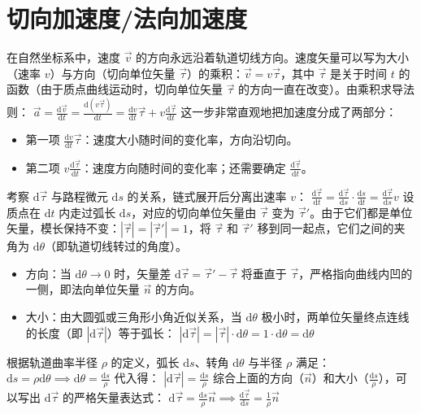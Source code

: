 \section{切向加速度/法向加速度}

在自然坐标系中，速度 $\vec{v}$ 的方向永远沿着轨道切线方向。速度矢量可以写为大小（速率 $v$）与方向（切向单位矢量 $\vec{\tau}$）的乘积：$\vec{v} = v\vec{\tau}$，其中 $\vec{\tau}$ 是关于时间 $t$ 的函数（由于质点曲线运动时，切向单位矢量 $\vec{\tau}$ 的方向一直在改变）。由乘积求导法则： \(\vec{a} = \frac{\mathrm{d}\vec{v}}{\mathrm{d}t} = \frac{\mathrm{d}(v\vec{\tau})}{\mathrm{d}t} = \frac{\mathrm{d}v}{\mathrm{d}t}\vec{\tau} + v\frac{\mathrm{d}\vec{\tau}}{\mathrm{d}t}\) 
这一步非常直观地把加速度分成了两部分：
\begin{itemize}
\item 第一项 $\frac{\mathrm{d}v}{\mathrm{d}t}\vec{\tau}$：速度大小随时间的变化率，方向沿切向。
\item 第二项 $v\frac{\mathrm{d}\vec{\tau}}{\mathrm{d}t}$：速度方向随时间的变化率；还需要确定 $\frac{\mathrm{d}\vec{\tau}}{\mathrm{d}t}$。
\end{itemize}
考察 $\mathrm{d}\vec{\tau}$ 与路程微元 $\mathrm{d}s$ 的关系，链式展开后分离出速率 $v$：
 \(\frac{\mathrm{d}\vec{\tau}}{\mathrm{d}t} = \frac{\mathrm{d}\vec{\tau}}{\mathrm{d}s} \cdot \frac{\mathrm{d}s}{\mathrm{d}t} = \frac{\mathrm{d}\vec{\tau}}{\mathrm{d}s} v\) 
设质点在 $\mathrm{d}t$ 内走过弧长 $\mathrm{d}s$，对应的切向单位矢量由 $\vec{\tau}$ 变为 $\vec{\tau}'$。由于它们都是单位矢量，模长保持不变：$|\vec{\tau}| = |\vec{\tau}'| = 1$，将 $\vec{\tau}$ 和 $\vec{\tau}'$ 移到同一起点，它们之间的夹角为 $\mathrm{d}\theta$（即轨道切线转过的角度）。
\begin{itemize}
\item 方向：当 $\mathrm{d}\theta \to 0$ 时，矢量差 $\mathrm{d}\vec{\tau} = \vec{\tau}' - \vec{\tau}$ 将垂直于 $\vec{\tau}$，严格指向曲线内凹的一侧，即法向单位矢量 $\vec{n}$ 的方向。
\item 大小：由大圆弧或三角形小角近似关系，当 $\mathrm{d}\theta$ 极小时，两单位矢量终点连线的长度（即 $|\mathrm{d}\vec{\tau}|$）等于弧长： \(|\mathrm{d}\vec{\tau}| = |\vec{\tau}| \cdot \mathrm{d}\theta = 1 \cdot \mathrm{d}\theta = \mathrm{d}\theta\) 
\end{itemize}
根据轨道曲率半径 $\rho$ 的定义，弧长 $\mathrm{d}s$、转角 $\mathrm{d}\theta$ 与半径 $\rho$ 满足：
 \(\mathrm{d}s = \rho \mathrm{d}\theta \implies \mathrm{d}\theta = \frac{\mathrm{d}s}{\rho}\) 
代入得： \(|\mathrm{d}\vec{\tau}| = \frac{\mathrm{d}s}{\rho}\) 
综合上面的方向（$\vec{n}$）和大小（$\frac{\mathrm{d}s}{\rho}$），可以写出 $\mathrm{d}\vec{\tau}$ 的严格矢量表达式： \(\mathrm{d}\vec{\tau} = \frac{\mathrm{d}s}{\rho}\vec{n} \implies \frac{\mathrm{d}\vec{\tau}}{\mathrm{d}s} = \frac{1}{\rho}\vec{n}\) 

